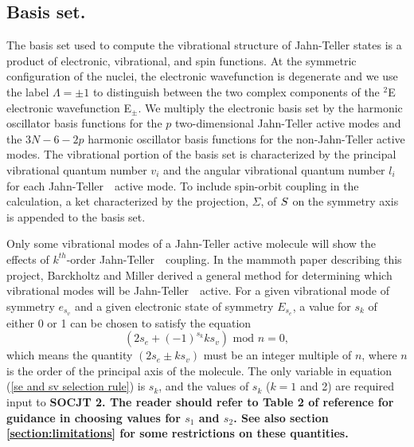 \documentclass{article}
\newcommand{\JT}{Jahn-Teller\ }
\newcommand{\socjttwo}{\bf{SOCJT 2}}
\begin{document}
\subsection{Basis set.} The basis set used to compute the vibrational 
structure of Jahn-Teller states is a product of electronic, vibrational,
and spin functions. At the symmetric configuration of the nuclei, 
the electronic wavefunction is degenerate and we use the label
$\Lambda = \pm 1$ to distinguish between the 
two complex components of the $^2$E electronic wavefunction E$_\pm$. 
We multiply the electronic basis set by the harmonic oscillator basis
functions for the $p$ two-dimensional Jahn-Teller active modes and the
$3N-6-2p$ harmonic oscillator basis functions for the non-Jahn-Teller
active modes. The vibrational portion of the basis set is
characterized by the principal vibrational quantum number $v_i$ and
the angular vibrational quantum number $l_i$ for each \JT\ active mode.
To include spin-orbit coupling in the calculation,
a ket characterized by the projection, $\Sigma $, of ${\bf S}$ on the 
symmetry axis is appended to the basis set.

Only some vibrational modes of a Jahn-Teller active molecule will show
the effects of $k^{th}$-order \JT\ coupling. In the mammoth paper
describing this 
project, Barckholtz and Miller derived a general method for determining which vibrational
modes will be \JT\ active. For a given vibrational mode of symmetry
$e_{s_v}$ and  a given electronic state of symmetry $E_{s_e}$, a value
for $s_k$ of either 0 or 1 can be chosen to satisfy the equation
\begin{equation}
\left( 2s_e + (-1)^{s_k } ks_v \right) \text{ mod } n=0,
\label{se and sv selection rule}
\end{equation}
which means the quantity $\left( 2s_e \pm ks_v \right) $
must be an integer multiple of $n$, where $n$ is the order of the
principal axis of the molecule. The only variable in equation (\ref{se
  and sv selection rule}) is $s_k$, and the values of $s_k$ ($k=1$ and 2)
are required input to \socjttwo. The reader should refer to Table 2 of
reference  for guidance in choosing values for $s_1$ and
$s_2$. See also section \ref{section:limitations} for some
restrictions on these quantities.
\end{document}
